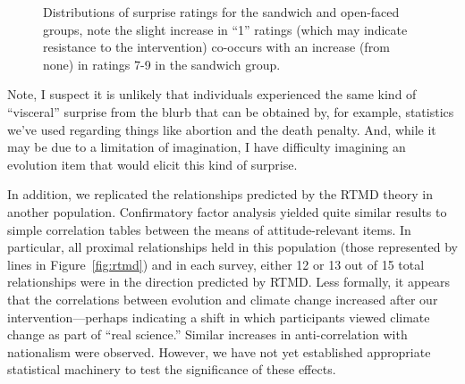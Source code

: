 \begin{figure}[h]
    \centering
    \caption{Distributions of surprise ratings for the sandwich and open-faced
        groups, note the slight increase in ``1'' ratings (which may indicate resistance
        to the intervention) co-occurs with an increase (from none) in ratings 7-9 in
        the sandwich group.}
\end{figure}

Note, I suspect it is unlikely that individuals experienced the same kind of
``visceral'' surprise from the blurb that can be obtained by, for example,
statistics we've used regarding things like abortion and the death penalty. And,
while it may be due to a limitation of imagination, I have difficulty imagining
an evolution item that would elicit this kind of surprise.

In addition, we replicated the relationships predicted by the RTMD theory in
another population. Confirmatory factor analysis yielded quite similar results
to simple correlation tables between the means of attitude-relevant items. In
particular, all proximal relationships held in this population (those
represented by lines in Figure~\ref{fig:rtmd}) and in each survey, either 12 or
13 out of 15 total relationships were in the direction predicted by RTMD. Less
formally, it appears that the correlations between evolution and climate change
increased after our intervention---perhaps indicating a shift in which
participants viewed climate change as part of ``real science.'' Similar
increases in anti-correlation with nationalism were observed. However, we have
not yet established appropriate statistical machinery to test the significance
of these effects.

